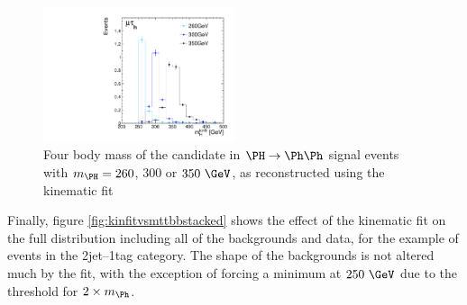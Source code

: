 \begin{figure}
\begin{center}
    \includegraphics[width=0.5\textwidth]
      {plots/Hhh/m_H_kinfit_signalmasses_2jet2tagSFMassCuts_mt.pdf}

\end{center}
\caption{
Four body mass of the candidate \PH in $\PH\to\Ph\Ph$ signal events with
$m_{\PH}=260$, $300$ or $350~\GeV$, as reconstructed using the kinematic fit}
\label{fig:kinfitsignalmasses}
\end{figure} 

Finally, figure \ref{fig:kinfitvsmttbbstacked} shows the effect of the kinematic
fit on the full distribution including all of the backgrounds and data, for the
example of events in the 2jet--1tag category. The shape of the backgrounds is
not altered much by the fit, with the exception of forcing a minimum at
$250~\GeV$ due to the threshold for $2\times m_{\Ph}$. 

